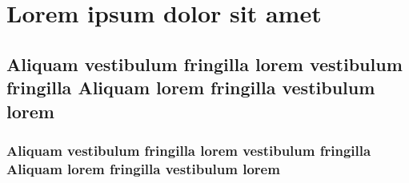 \chapter{Lorem ipsum dolor sit amet}\label{cap:exampleChapter}
\thispagestyle{empty}

\lipsum[1]

\section{Aliquam vestibulum fringilla lorem vestibulum fringilla Aliquam lorem fringilla vestibulum lorem}

\lipsum[1]

\begin{citacao}
  \lipsum[1]
\end{citacao}

\lipsum[1]

\subsection{Aliquam vestibulum fringilla lorem vestibulum fringilla Aliquam lorem fringilla vestibulum lorem}


\lipsum[1]


\lipsum[1]

\lipsum[1]

\lipsum[3-4]

\lipsum[2]
